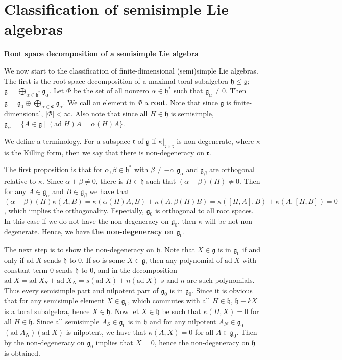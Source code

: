 \documentclass{article}
\newcommand{\SBar}{\;|\;}
\newcommand{\lie}[1]{\mathfrak{#1}}
\newcommand{\ad}[1]{\mathrm{ad}\; #1}
\begin{document}
\newpage

\part{Classification of semisimple Lie algebras}

\newpage

\textbf{Root space decomposition of a semisimple Lie algebra}

We now start to the classification of finite-dimensional (semi)simple Lie algebras.
The first is the root space decomposition of a maximal toral subalgebra $\lie{h} \le \lie{g}$; $\lie{g} = \bigoplus_{\alpha \in \lie{h}^*} \lie{g}_\alpha$.
Let $\Phi$ be the set of all nonzero $\alpha \in \lie{h}^*$ such that $\lie{g}_\alpha \ne 0$.
Then $\lie{g} = \lie{g}_0 \oplus \bigoplus_{\alpha \in \Phi} \lie{g}_\alpha$.
We call an element in $\Phi$ a \textbf{root}.
Note that since $\lie{g}$ is finite-dimensional, $|\Phi| < \infty$.
Also note that since all $H \in \lie{h}$ is semisimple, $\lie{g}_\alpha = \{A \in \lie{g} \SBar (\ad{H})A = \alpha(H)A\}$.

We define a terminology.
For a subspace $\lie{r}$ of $\lie{g}$ if $\kappa|_{\lie{r} \times \lie{r}}$ is non-degenerate, where $\kappa$ is the Killing form, then we say that there is non-degeneracy on $\lie{r}$.

The first proposition is that for $\alpha, \beta \in \lie{h}^*$ with $\beta \ne -\alpha$ $\lie{g}_\alpha$ and $\lie{g}_\beta$ are orthogonal relative to $\kappa$.
Since $\alpha + \beta \ne 0$, there is $H \in \lie{h}$ such that $(\alpha + \beta)(H) \ne 0$.
Then for any $A \in \lie{g}_\alpha$ and $B \in \lie{g}_\beta$ we have that $(\alpha + \beta)(H) \kappa(A, B) = \kappa(\alpha(H) A, B) + \kappa(A, \beta(H) B) = \kappa([H, A], B) + \kappa(A, [H, B]) = 0$, which implies the orthogonality.
Especially, $\lie{g}_0$ is orthogonal to all root spaces.
In this case if we do not have the non-degeneracy on $\lie{g}_0$, then $\kappa$ will be not non-degenerate.
Hence, we have \textbf{the non-degeneracy on $\lie{g}_0$}.

The next step is to show the non-degeneracy on $\lie{h}$.
Note that $X \in \lie{g}$ is in $\lie{g}_0$ if and only if $\ad{X}$ sends $\lie{h}$ to 0.
If so is some $X \in \lie{g}$, then any polynomial of $\ad{X}$ with constant term 0 sends $\lie{h}$ to 0, and in the decomposition $\ad{X} = \ad{X_S} + \ad{X_N} = s(\ad{X}) + n(\ad{X})$ $s$ and $n$ are such polynomials.
Thus every semisimple part and nilpotent part of $\lie{g}_0$ is in $\lie{g}_0$.
Since it is obvious that for any semisimple element $X \in \lie{g}_0$, which commutes with all $H \in \lie{h}$, $\lie{h} + kX$ is a toral subalgebra, hence $X \in \lie{h}$.
Now let $X \in \lie{h}$ be such that $\kappa(H, X) = 0$ for all $H \in \lie{h}$.
Since all semisimple $A_S \in \lie{g}_0$ is in $\lie{h}$ and for any nilpotent $A_N \in \lie{g}_0$ $(\ad{A_N})(\ad{X})$ is nilpotent, we have that $\kappa(A, X) = 0$ for all $A \in \lie{g}_0$.
Then by the non-degeneracy on $\lie{g}_0$ implies that $X = 0$, hence the non-degeneracy on $\lie{h}$ is obtained.
\end{document}
